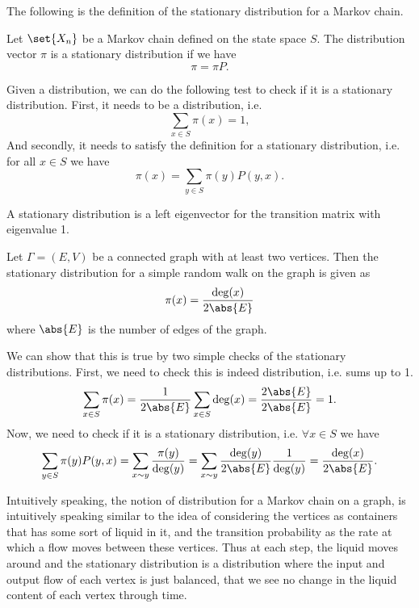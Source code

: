 The following is the definition of the stationary distribution for a Markov chain.

\begin{definition}
	Let $ \set{X_n} $ be a Markov chain defined on the state space $ S $. The distribution vector $ \pi $ is a stationary distribution if we have
	\[ \pi = \pi P. \]
\end{definition}

\begin{remark}
	Given a distribution, we can do the following test to check if it is a stationary distribution. First, it needs to be a distribution, i.e.
	\[ \sum_{x\in S} \pi(x) = 1, \]
	And secondly, it needs to satisfy the definition for a stationary distribution, i.e. for all $ x\in S$ we have
	\[ \pi(x) = \sum_{y\in S} \pi(y)P(y,x). \]
\end{remark}

\begin{observation}
	A stationary distribution is a left eigenvector for the transition matrix with eigenvalue 1. 
\end{observation}

\begin{proposition}
	Let $ \Gamma = (E,V) $ be a connected graph with at least two vertices. Then the stationary distribution for a simple random walk on the graph is given as
	\[ \pi(x) = \frac{\deg(x)}{2\abs{E}} \]
	where $ \abs{E} $ is the number of edges of the graph.
\end{proposition}
\begin{remark}
	We can show that this is true by two simple checks of the stationary distributions. First, we need to check this is indeed distribution, i.e. sums up to 1.
	\[ \sum_{x\in S} \pi(x) = \frac{1}{2\abs{E}} \sum_{x\in S}\deg(x) = \frac{2\abs{E}}{2\abs{E}} = 1. \]
	Now, we need to check if it is a stationary distribution, i.e. $ \forall x \in S $ we have
	\[ \sum_{y\in S}\pi(y)P(y,x) = \sum_{x\sim y} \frac{\pi(y)}{\deg(y)} = \sum_{x\sim y} \frac{\deg(y)}{2\abs{E}}\frac{1}{\deg(y)} = \frac{\deg(x)}{2\abs{E}}. \]
\end{remark}

\begin{observation}
	Intuitively speaking, the notion of distribution for a Markov chain on a graph, is intuitively speaking similar to the idea of considering the vertices as containers that has some sort of liquid in it, and the transition probability as the rate at which a flow moves between these vertices. Thus at each step, the liquid moves around and the stationary distribution is a distribution where the input and output flow of each vertex is just balanced, that we see no change in the liquid content of each vertex through time. 
\end{observation} 


